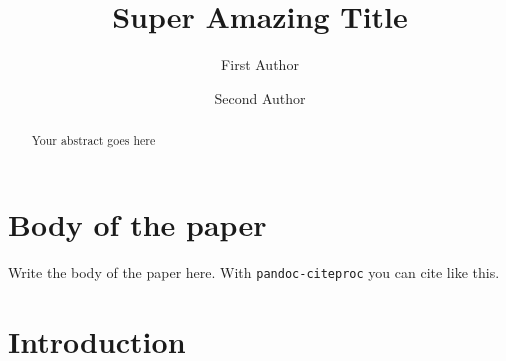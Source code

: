 \documentclass[3p]{elsarticle/elsarticle}
\begin{document}
\begin{frontmatter}
\title{Super Amazing Title}
\author[Group1]{First Author}



\author[Group2]{Second Author}



\address[Group1]{Department of this thing, some university, some country}
\address[Group2]{Department of that thing, some university, some country}



\begin{abstract}
Your abstract goes here
\end{abstract}

\begin{keyword}

\end{keyword}

\end{frontmatter}


\section{Body of the paper}\label{body-of-the-paper}

Write the body of the paper here. With \texttt{pandoc-citeproc} you can cite like
this\citep{jith_crossing_2013}.
\section{Introduction}



\renewcommand\refname{References}

\end{document}
